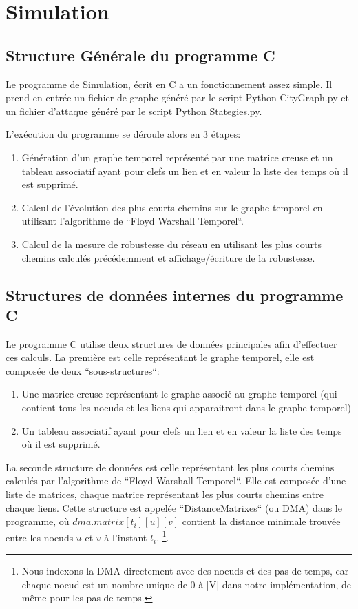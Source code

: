 \section{Simulation}\label{sec:simulation}

\subsection{Structure Générale du programme C}

Le programme de Simulation, écrit en C a un fonctionnement assez simple. 
Il prend en entrée un fichier de graphe généré par le script Python CityGraph.py et un 
fichier d'attaque généré par le script Python Stategies.py. 

L'exécution du programme se déroule alors en 3 étapes:
\begin{enumerate}
    \item Génération d'un graphe temporel représenté par une matrice creuse et un tableau associatif ayant pour clefs un lien et en valeur la liste des temps où il est supprimé. 
    \item Calcul de l'évolution des plus courts chemins sur le graphe temporel en utilisant l'algorithme de ``Floyd Warshall Temporel``.
    \item Calcul de la mesure de robustesse du réseau en utilisant les plus courts chemins calculés précédemment et affichage/écriture de la robustesse.
\end{enumerate}

\subsection{Structures de données internes du programme C}
Le programme C utilise deux structures de données principales afin d'effectuer ces calculs. 
La première est celle représentant le graphe temporel, elle est composée de deux ``sous-structures``:
\begin{enumerate}
    \item Une matrice creuse représentant le graphe associé au graphe temporel (qui contient tous les noeuds et les liens qui apparaitront dans le graphe temporel)
    \item Un tableau associatif ayant pour clefs un lien et en valeur la liste des temps où il est supprimé.
\end{enumerate}
La seconde structure de données est celle représentant les plus courts chemins calculés par l'algorithme de ``Floyd Warshall Temporel``.
Elle est composée d'une liste de matrices, chaque matrice représentant les plus courts chemins entre chaque liens.
Cette structure est appelée ``DistanceMatrixes`` (ou DMA) dans le programme, où $dma.matrix[t_{i}][u][v]$ contient la distance minimale trouvée entre les noeuds $u$ et $v$ à l'instant $t_{i}$.
\footnote{Nous indexons la DMA directement avec des noeuds et des pas de temps, car chaque noeud est un nombre unique de 0 à |V| dans notre implémentation, de même pour les pas de temps.}.


